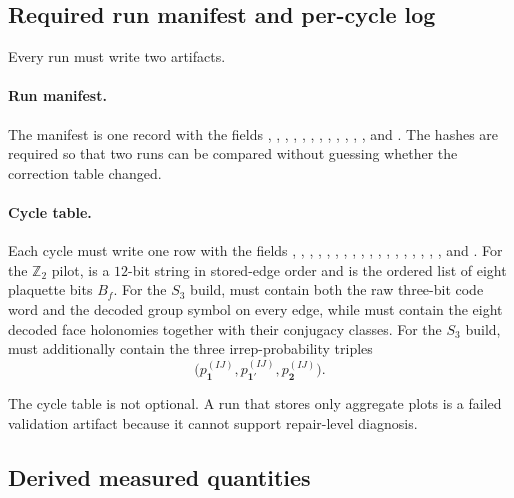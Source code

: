 \documentclass[11pt]{article}
\begin{document}
\subsection{Required run manifest and per-cycle log}

Every run must write two artifacts.

\paragraph{Run manifest.}
The manifest is one record with the fields , ,
, , , ,
, , , ,
, , and .
The hashes are required so that two runs can be compared without guessing whether the correction
table changed.

\paragraph{Cycle table.}
Each cycle must write one row with the fields , ,
, , ,
, , ,
, , ,
, , ,
, , ,
, and . For the $\mathbb Z_2$ pilot, 
is a $12$-bit string in stored-edge order and  is the ordered list of eight
plaquette bits $B_f$. For the $S_3$ build,  must contain both the raw
three-bit code word and the decoded group symbol on every edge, while  must
contain the eight decoded face holonomies together with their conjugacy classes. For the $S_3$
build,  must additionally
contain the three irrep-probability triples
\begin{equation}
\bigl(p_{\mathbf 1}^{(IJ)},p_{\mathbf 1'}^{(IJ)},p_{\mathbf 2}^{(IJ)}\bigr).
\end{equation}

The cycle table is not optional. A run that stores only aggregate plots is a failed validation
artifact because it cannot support repair-level diagnosis.

\subsection{Derived measured quantities}
\end{document}

